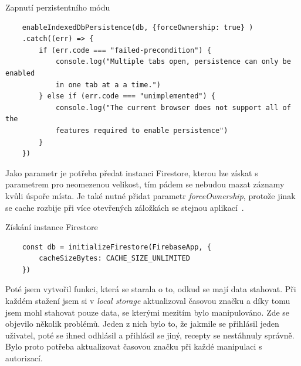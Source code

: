 \begin{listing}[h]
    \caption{Zapnutí perzistentního módu}
    \begin{verbatim}
    enableIndexedDbPersistence(db, {forceOwnership: true} )
    .catch((err) => {
        if (err.code === "failed-precondition") {
            console.log("Multiple tabs open, persistence can only be enabled
            in one tab at a a time.")
        } else if (err.code === "unimplemented") {
            console.log("The current browser does not support all of the
            features required to enable persistence")
        }
    })
    \end{verbatim}
\end{listing}

Jako parametr je potřeba předat instanci Firestore, kterou lze získat s parametrem pro neomezenou velikost, tím pádem se nebudou
mazat záznamy kvůli úspoře místa. Je také nutné přidat parametr \emph{forceOwnership}, protože jinak se cache rozbije při více
otevřených záložkách se stejnou aplikací~\cite{FirebaseMultipleTabs}.

\begin{listing}[h]
    \caption{Získání instance Firestore}
    \begin{verbatim}
    const db = initializeFirestore(FirebaseApp, {
        cacheSizeBytes: CACHE_SIZE_UNLIMITED
    })
    \end{verbatim}
\end{listing}

Poté jsem vytvořil funkci, která se starala o to, odkud se mají data stahovat. Při každém stažení jsem si v \emph{local storage} aktualizoval
časovou značku a díky tomu jsem mohl stahovat pouze data, se kterými mezitím bylo manipulováno. Zde se objevilo několik problémů. Jeden z nich
bylo to, že jakmile se přihlásil jeden uživatel, poté se ihned odhlásil a přihlásil se jiný, recepty se nestáhnuly správně. Bylo proto potřeba
aktualizovat časovou značku při každé manipulaci s autorizací.


